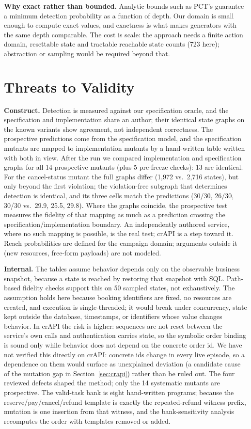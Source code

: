 \documentclass[conference]{IEEEtran}
\begin{document}
\textbf{Why exact rather than bounded.} Analytic bounds such as PCT's \cite{r20} guarantee
a minimum detection probability as a function of depth. Our domain is small enough to
compute exact values, and exactness is what makes generators with the same depth
comparable. The cost is scale: the approach needs a finite action domain, resettable state
and tractable reachable state counts (723 here); abstraction or sampling would be required
beyond that.

\section{Threats to Validity}
\label{sec:threats}
\textbf{Construct.} Detection is measured against our specification oracle, and the
specification and implementation share an author; their identical state graphs on the
known variants show agreement, not independent correctness. The prospective predictions
come from the specification model, and the specification mutants are mapped to
implementation mutants by a hand-written table written with both in view. After the
run we compared implementation and specification graphs for all 14 prospective mutants
(plus 5 pre-freeze checks): 13 are identical. For the cancel-status mutant the full
graphs differ (1{,}972 vs.\ 2{,}716 states), but only beyond the first violation; the
violation-free subgraph that determines detection is identical, and its three cells
match the predictions (30/30, 26/30, 30/30 vs.\ 29.9, 25.5, 29.8). Where the graphs
coincide, the prospective test measures
the fidelity of that mapping as much as a prediction crossing the
specification/implementation boundary. An independently authored service, where no such
mapping is possible, is the real test; crAPI is a step toward it. Reach probabilities are
defined for the campaign domain; arguments outside it (new resources, free-form payloads)
are not modeled.

\textbf{Internal.} The tables assume behavior depends only on the observable business
snapshot, because a state is reached by restoring that snapshot with SQL. Path-based
fidelity checks support this on 50 sampled states, not exhaustively. The assumption holds
here because booking identifiers are fixed, no resources are created, and execution is
single-threaded; it would break under concurrency, state kept outside the database,
timestamps, or identifiers whose value changes behavior. In crAPI the risk is higher:
sequences are not reset between the service's own calls and authentication carries state,
so the symbolic order binding is sound only while behavior does not depend on the concrete
order id. We have not verified this directly on crAPI: concrete ids change in every live
episode, so a dependence on them would surface as unexplained deviation (a candidate cause
of the mutation gap in Section~\ref{sec:crapi}) rather than be ruled out. The four reviewed defects shaped the method;
only the 14 systematic mutants are prospective. The valid-task bank is eight hand-written
programs; because the reserve/pay/cancel/refund template is exactly the repeated-refund
witness prefix, mutation is one insertion from that witness, and the bank-sensitivity
analysis recomputes the order with templates removed or added.
\end{document}
